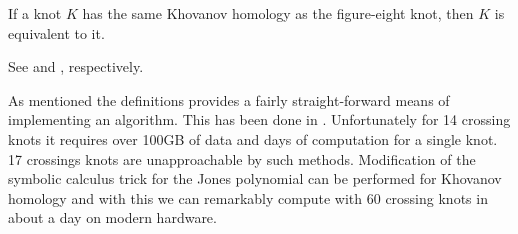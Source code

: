     \begin{theorem}
        If a knot $K$ has the same Khovanov homology as the figure-eight
        knot, then $K$ is equivalent to it.
    \end{theorem}
    See \cite{BaldwinSivekKhovanovTrefoils} and
    \cite{BaldwinDowlinKhovanovFigureEight}, respectively.
    \par\hfill\par
    As mentioned the definitions provides a fairly straight-forward means of
    implementing an algorithm. This has been done in
    \cite{sage}. Unfortunately for 14 crossing knots it requires over
    100GB of data and days of computation for a single knot. 17 crossings
    knots are unapproachable by such methods. Modification of the
    symbolic calculus trick for the Jones polynomial can be performed for
    Khovanov homology \cite{BarNatan2006FASTKH} and with this we can
    remarkably compute with 60 crossing knots in about a day on modern hardware.
